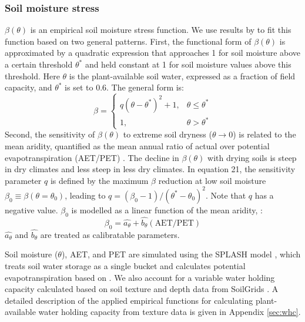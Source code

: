 \documentclass{myreport}
\begin{document}
\subsubsection{Soil moisture stress}
\label{sec:soilmstress}
$\beta(\theta)$ is an empirical soil moisture stress function. We use results by \citet{stocker18newphyt} to fit this function based on two general patterns. First, the functional form of $\beta(\theta)$ is approximated by a quadratic expression that approaches 1 for soil moisture above a certain threshold $\theta^{\ast}$ and held constant at 1 for soil moisture values above this threshold. Here $\theta$ is the plant-available soil water, expressed as a fraction of field capacity, and $\theta^{\ast}$ is set to 0.6. The general form is:
\begin{equation}
\label{eq:soilmstress}
    \beta =
\begin{cases}
    q(\theta - \theta^{\ast})^2 + 1,& \theta \leq \theta^{\ast}\\
    1,              & \theta > \theta^{\ast}
\end{cases}
\end{equation}
Second, the sensitivity of $\beta(\theta)$ to extreme soil dryness ($\theta \rightarrow 0$) is related to the mean aridity, quantified as the mean annual ratio of actual over potential evapotranspiration (AET/PET) \citep{stocker18newphyt}. The decline in $\beta(\theta)$ with drying soils is steep in dry climates and less steep in less dry climates. In equation 21, the sensitivity parameter $q$ is defined by the maximum $\beta$ reduction at low soil moisture $\beta_0\equiv\beta(\theta=\theta_0)$, leading to $q=(\beta_0-1)/(\theta^{\ast}-\theta_0)^2$. Note that $q$ has a negative value. $\beta_0$ is modelled as a linear function of the mean aridity, :
\begin{equation}
\label{eq:soilmsensitivity}
\beta_0 = \widehat{a_{\theta}} + \widehat{b_{\theta}} (\text{AET}/\text{PET})
\end{equation}
$\widehat{a_{\theta}}$ and $\widehat{b_{\theta}}$ are treated as calibratable parameters. 

Soil moisture ($\theta$), AET, and PET are simulated using the SPLASH model \citep{davis17}, which treats soil water storage as a single bucket and calculates potential evapotranspiration based on \citet{priestleytaylor72}. We also account for a variable water holding capacity calculated based on soil texture and depth data from SoilGrids \citep{Hengl2014-jm}. A detailed description of the applied empirical functions for calculating plant-available water holding capacity from texture data is given in Appendix \ref{sec:whc}.
\end{document}
